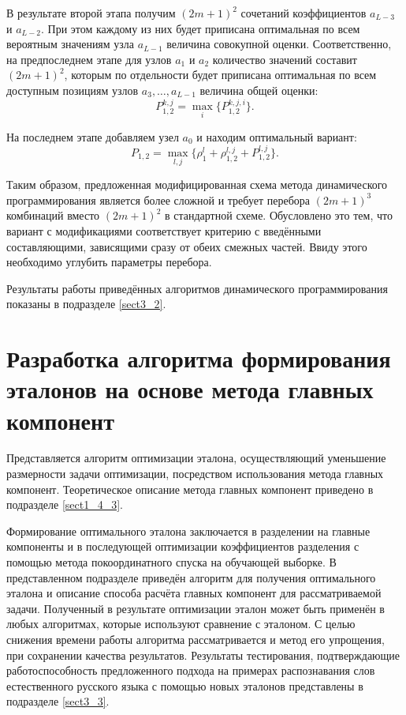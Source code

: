 В результате второй этапа получим $(2m + 1)^2$ сочетаний коэффициентов $a_{L-3}$ и $a_{L-2}$.
При этом каждому из них будет приписана оптимальная по всем вероятным значениям узла $a_{L-1}$ величина совокупной оценки.
Соответственно, на предпоследнем этапе для узлов $a_1$ и $a_2$ количество значений составит $(2m + 1)^2$, которым по отдельности будет приписана оптимальная по всем доступным позициям узлов $a_3, \dots, a_{L-1}$ величина общей оценки:
\begin{equation}
P_{1, 2}^{k, j} = \max_{i} \{ P_{1, 2}^{k, j, i} \}.
\end{equation}

На последнем этапе добавляем узел $a_0$ и находим оптимальный вариант:
\begin{equation}
P_{1, 2} = \max_{l, j} \{ \rho_1^l + \rho_{1, 2}^{l, j} + P_{1, 2}^{l, j} \}.
\end{equation}

Таким образом, предложенная модифицированная схема метода динамического программирования является более сложной и требует перебора $(2m + 1)^3$ комбинаций вместо $(2m + 1)^2$ в стандартной схеме.
Обусловлено это тем, что вариант с модификациями соответствует критерию с введёнными составляющими, зависящими сразу от обеих смежных частей.
Ввиду этого необходимо углубить параметры перебора.

Результаты работы приведённых алгоритмов динамического программирования показаны в подразделе \ref{sect3_2}.


\section{Разработка алгоритма формирования эталонов на основе метода главных компонент} \label{sect2_3}

Представляется алгоритм оптимизации эталона, осуществляющий уменьшение размерности задачи оптимизации, посредством использования метода главных компонент.
Теоретическое описание метода главных компонент приведено в подразделе \ref{sect1_4_3}.

Формирование оптимального эталона заключается в разделении на главные компоненты и в последующей оптимизации коэффициентов разделения с помощью метода покоординатного спуска на обучающей выборке.
В представленном подразделе приведён алгоритм для получения оптимального эталона и описание способа расчёта главных компонент для рассматриваемой задачи.
Полученный в результате оптимизации эталон может быть применён в любых алгоритмах, которые используют сравнение с эталоном.
С целью снижения времени работы алгоритма рассматривается и метод его упрощения, при сохранении качества результатов.
Результаты тестирования, подтверждающие работоспособность предложенного подхода на примерах распознавания слов естественного русского языка с помощью новых эталонов представлены в подразделе \ref{sect3_3}.

